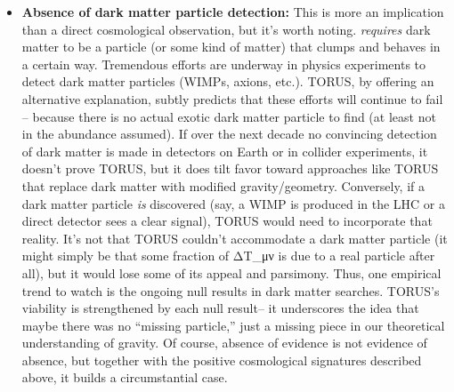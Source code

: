 \documentclass[
]{article}
\begin{document}
{\begin{itemize}
  Experiments like CMB-S4 will push the search for such topological
  signatures\hspace{0pt}. TORUS effectively predicts \textbf{``cosmic
  topology matters''} -- we should not assume an infinite featureless
  space if the theory is correct. If evidence of a finite
  multi-connected universe (like a spatial torus) is found, it would
  beautifully support TORUS's foundational premise. If, however, the
  universe appears perfectly isotropic and simple with no anomalies or
  topology signals at the largest scales, then one of TORUS's avenues of
  corroboration closes. The theory would then rely on smaller-scale
  tests.
\item
  \textbf{Absence of dark matter particle detection:} This is more an
  implication than a direct cosmological observation, but it's worth
  noting. \LambdaCDM \emph{requires} dark matter to be a particle (or some
  kind of matter) that clumps and behaves in a certain way. Tremendous
  efforts are underway in physics experiments to detect dark matter
  particles (WIMPs, axions, etc.). TORUS, by offering an alternative
  explanation, subtly predicts that these efforts will continue to fail
  -- because there is no actual exotic dark matter particle to find (at
  least not in the abundance assumed). If over the next decade no
  convincing detection of dark matter is made in detectors on Earth or
  in collider experiments, it doesn't prove TORUS, but it does tilt
  favor toward approaches like TORUS that replace dark matter with
  modified gravity/geometry. Conversely, if a dark matter particle
  \emph{is} discovered (say, a WIMP is produced in the LHC or a direct
  detector sees a clear signal), TORUS would need to incorporate that
  reality. It's not that TORUS couldn't accommodate a dark matter
  particle (it might simply be that some fraction of
  ΔT_{μν}{} is due to a
  real particle after all), but it would lose some of its appeal and
  parsimony. Thus, one empirical trend to watch is the ongoing null
  results in dark matter searches. TORUS's viability is strengthened by
  each null result\hspace{0pt}-- it underscores the idea that maybe
  there was no ``missing particle,'' just a missing piece in our
  theoretical understanding of gravity. Of course, absence of evidence
  is not evidence of absence, but together with the positive
  cosmological signatures described above, it builds a circumstantial
  case.
\end{itemize}

}
\end{document}
